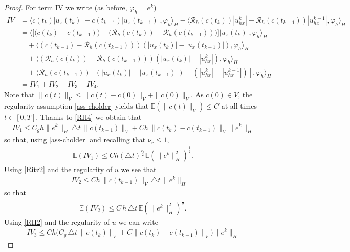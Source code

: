 \documentclass[a4paper,10pt]{article}
\numberwithin{equation}{section}
\begin{document}
\begin{proof}
For term IV we write (as before, $\varphi_{h}=e^{k}$)
\begin{align*}
IV&=\langle c(t_{k}) |u_{x}(t_{k})| - c(t_{k-1}) |u_{x}(t_{k-1})|, \varphi_{h}\rangle_{H} -\langle \mathcal{R}_{h}(c(t_{k})) | u^{k}_{hx}| -\mathcal{R}_{h}(c(t_{k-1})) | u^{k-1}_{hx}|, \varphi_{h}\rangle_{H} \\
&=\langle \Big[ \big( c(t_{k}) - c(t_{k-1})\big) -\big(\mathcal{R}_{h}(c(t_{k})) - \mathcal{R}_{h}(c(t_{k-1})) \big) \Big]|u_{x}(t_{k})| , \varphi_{h}\rangle_{H} \\
& \quad+ \langle ( c(t_{k-1})-\mathcal{R}_{h}(c(t_{k-1}))) ( |u_{x}(t_{k})| - |u_{x}(t_{k-1})|), \varphi_{h}\rangle_{H} \\
& \quad+ \langle (\mathcal{R}_{h}(c(t_{k})) - \mathcal{R}_{h}(c(t_{k-1}))) (|u_{x}(t_{k})| - | u^{k}_{hx}|), \varphi_{h}\rangle_{H}
\\
&\quad+\langle \mathcal{R}_{h}(c(t_{k-1})) [( |u_{x}(t_{k})| - |u_{x}(t_{k-1})|)-( | u^{k}_{hx}| - | u^{k-1}_{hx}|)], \varphi_{h}\rangle_{H}\\
& = IV_{1}+IV_{2}+IV_{3}+IV_{4}.
\end{align*}
Note that $\| c(t) \|_V \leq \| c(t) - c(0) \|_V + \| c(0) \|_V$. As $c(0) \in V$, the regularity assumption \eqref{ass-cholder} yields that $\mathbb{E}(\| c(t) \|_V) \leq C$ at all times $t \in [0,T]$. Thanks to \eqref{RH4} we obtain that
\begin{align*}
IV_{1} \leq C_{g} h \| e^{k} \|_{H} \, \triangle t \, \| c(t_{k-1}) \|_{V}
+ C h \, \| c(t_{k}) - c(t_{k-1})\|_{V} \| e^{k}\|_{H}
\end{align*}
so that, using \eqref{ass-cholder} and recalling that $\nu_{r} \leq 1$,
\begin{align*}
\mathbb{E}(IV_{1}) \leq C h (\triangle t)^{\frac{\nu_{r}}{2}} \mathbb{E}(\| e^{k}\|_{H}^{2})^{\frac{1}{2}}.
\end{align*}
Using \eqref{Ritz2} and the regularity of $u$ we see that
\begin{align*}
IV_{2} \leq C h \, \| c(t_{k-1}) \|_{V} \, \triangle t \, \| e^{k}\|_{H} \quad
\end{align*}
so that
\begin{align*}
\mathbb{E}(IV_{2}) \leq C \, h \, \triangle t \, \mathbb{E}(\| e^{k}\|_{H}^{2})^{\frac{1}{2}}.
\end{align*}
Using \eqref{RH2} and the regularity of $u$ we can write
\begin{align*}
IV_{3} \leq Ch \Big(C_{g} \, \triangle t \, \| c(t_{k}) \|_{V} + C \| c(t_{k}) - c(t_{k-1})\|_{V} \Big) \| e^{k}\|_{H}

\end{align*}
\end{proof}
\end{document}
